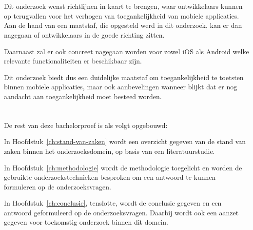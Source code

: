 \section{}
\label{sec:onderzoeksdoelstelling}


Dit onderzoek wenst richtlijnen in kaart te brengen, waar ontwikkelaars kunnen op terugvallen voor het verhogen van toegankelijkheid van mobiele applicaties. Aan de hand van een maatstaf, die opgesteld werd in dit onderzoek, kan er dan nagegaan of ontwikkelaars in de goede richting zitten.

Daarnaast zal er ook concreet nagegaan worden voor zowel iOS als Android welke relevante functionaliteiten er beschikbaar zijn. 

Dit onderzoek biedt dus een duidelijke maatstaf om toegankelijkheid te toetsten binnen mobiele applicaties, maar ook aanbevelingen wanneer blijkt dat er nog aandacht aan toegankelijkheid moet besteed worden.
\section{}
\label{sec:opzet-bachelorproef}


De rest van deze bachelorproef is als volgt opgebouwd:

In Hoofdstuk~\ref{ch:stand-van-zaken} wordt een overzicht gegeven van de stand van zaken binnen het onderzoeksdomein, op basis van een literatuurstudie.

In Hoofdstuk~\ref{ch:methodologie} wordt de methodologie toegelicht en worden de gebruikte onderzoekstechnieken besproken om een antwoord te kunnen formuleren op de onderzoeksvragen.


In Hoofdstuk~\ref{ch:conclusie}, tenslotte, wordt de conclusie gegeven en een antwoord geformuleerd op de onderzoeksvragen. Daarbij wordt ook een aanzet gegeven voor toekomstig onderzoek binnen dit domein.